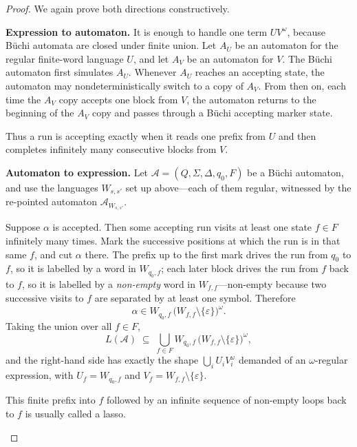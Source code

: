 \begin{proof}
We again prove both directions constructively.

\medskip
\noindent\textbf{Expression to automaton.}
It is enough to handle one term $UV^\omega$, because B\"uchi automata
are closed under finite union.  Let $A_U$ be an automaton for the regular
finite-word language $U$, and let $A_V$ be an automaton for $V$.  The
B\"uchi automaton first simulates $A_U$.  Whenever $A_U$ reaches an
accepting state, the automaton may nondeterministically switch to a
copy of $A_V$.  From then on, each time the $A_V$ copy accepts one block
from $V$, the automaton returns to the beginning of the $A_V$ copy and
passes through a B\"uchi accepting marker state.

Thus a run is accepting exactly when it reads one prefix from $U$ and
then completes infinitely many consecutive blocks from $V$.

\medskip
\noindent\textbf{Automaton to expression.}
Let $\mathcal{A}=(Q,\Sigma,\Delta,q_0,F)$ be a B\"uchi automaton, and use
the languages $W_{s,s'}$ set up above---each of them regular, witnessed
by the re-pointed automaton $\mathcal{A}_{W_{s,s'}}$.

Suppose $\alpha$ is accepted.  Then some accepting run visits at least one
state $f\in F$ infinitely many times.  Mark the successive positions at
which the run is in that same $f$, and cut $\alpha$ there.  The prefix up
to the first mark drives the run from $q_0$ to $f$, so it is labelled by a
word in $W_{q_0,f}$; each later block drives the run from $f$ back to $f$,
so it is labelled by a \emph{non-empty} word in $W_{f,f}$---non-empty
because two successive visits to $f$ are separated by at least one symbol.
Therefore
\[
  \alpha\in W_{q_0,f}\,\bigl(W_{f,f}\setminus\{\varepsilon\}\bigr)^\omega.
\]
Taking the union over all $f\in F$,
\[
  L(\mathcal{A}) \;\subseteq\; \bigcup_{f\in F}
     W_{q_0,f}\,\bigl(W_{f,f}\setminus\{\varepsilon\}\bigr)^\omega ,
\]
and the right-hand side has exactly the shape $\bigcup_i U_i V_i^\omega$
demanded of an $\omega$-regular expression, with $U_f=W_{q_0,f}$ and
$V_f=W_{f,f}\setminus\{\varepsilon\}$.

This finite prefix into $f$ followed by an infinite sequence of
non-empty loops back to $f$ is usually called a lasso.

\begin{center}
\end{center}
\end{proof}
